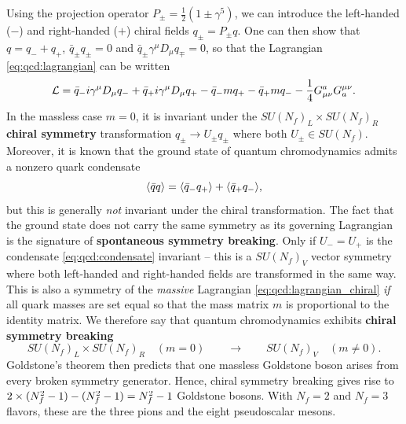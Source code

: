 Using the projection operator $P_\pm = \frac12 (1 \pm \gamma^5)$, we can introduce the left-handed ($-$) and right-handed ($+$) chiral fields $q_\pm = P_\pm q$.
One can then show that $q = q_- + q_+$, $\bar{q}_\pm q_\pm = 0$ and $\bar{q}_\pm \gamma^\mu D_\mu q_\mp = 0$, so that the Lagrangian \eqref{eq:qcd:lagrangian} can be written
\begin{equation}
	\mathcal{L} = \bar{q}_- i \gamma^\mu D_\mu q_- + \bar{q}_+ i \gamma^\mu D_\mu q_+ - \bar{q}_- m q_+ - \bar{q}_+ m q_- - \frac14 G_{\mu\nu}^a G^{\mu\nu}_a.
\label{eq:qcd:lagrangian_chiral}
\end{equation}
In the massless case $m=0$,
it is invariant under the $SU(N_f)_L \times SU(N_f)_R$ \textbf{chiral symmetry} transformation $q_\pm \rightarrow U_\pm q_\pm$ where both $U_\pm \in SU(N_f)$.
Moreover, it is known that the ground state of quantum chromodynamics admits a nonzero quark condensate \cite[chapter 28]{ref:schwartz}
\begin{equation}
	\avg{\bar{q} q} %
	                                                            = \avg{\bar{q}_- q_+} + \avg{\bar{q}_+ q_-},
\label{eq:qcd:condensate}
\end{equation}
but this is generally \emph{not} invariant under the chiral transformation.
The fact that the ground state does not carry the same symmetry as its governing Lagrangian is the signature of \textbf{spontaneous symmetry breaking}.
Only if $U_- = U_+$ is the condensate \eqref{eq:qcd:condensate} invariant -- this is a $SU(N_f)_V$ vector symmetry where both left-handed and right-handed fields are transformed in the same way.
This is also a symmetry of the \emph{massive} Lagrangian \eqref{eq:qcd:lagrangian_chiral} \emph{if} all quark masses are set equal so that the mass matrix $m$ is proportional to the identity matrix.
We therefore say that quantum chromodynamics exhibits \textbf{chiral symmetry breaking}
\begin{equation}
	SU(N_f)_L \times SU(N_f)_R \quad (m = 0) \qquad \longrightarrow \qquad SU(N_f)_V \quad (m \neq 0).
\label{eq:qcd:symmetry_breaking_pattern}
\end{equation}
Goldstone's theorem then predicts that one massless Goldstone boson arises from every broken symmetry generator.
Hence, chiral symmetry breaking gives rise to $2 \times (\smash{N_f^2} - 1) - (\smash{N_f^2} - 1) = \smash{N_f^2} - 1$ Goldstone bosons.
With $N_f = 2$ and $N_f = 3$ flavors, these are the three pions and the eight pseudoscalar mesons.

